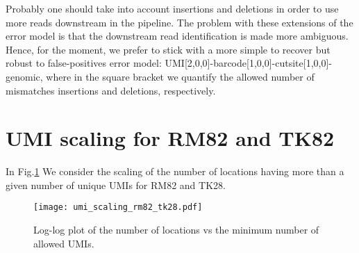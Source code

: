\documentclass[11pt,a4paper]{article}
\begin{document}

Probably one should take into account insertions and deletions in order to use more reads downstream in the pipeline. The problem with these extensions of the error model is that the downstream read identification is made more ambiguous. Hence, for the moment, we prefer to stick with a more simple to recover but robust to false-positives error model: UMI[2,0,0]-barcode[1,0,0]-cutsite[1,0,0]-genomic, where in the square bracket we quantify the allowed number of mismatches insertions and deletions, respectively.

\section{UMI scaling for RM82 and TK82}
In Fig.\ref{fig:umi_scaling_rm82_tk28} We consider the scaling of the number of locations having more than 
a given number of unique UMIs for RM82 and TK28.

\begin{figure}[hbtp]
\centering
\texttt{[image: umi\_scaling\_rm82\_tk28.pdf]}
\caption{Log-log plot of the number of locations vs the minimum number of allowed UMIs.}
\label{fig:umi_scaling_rm82_tk28}
\end{figure}
\end{document}
